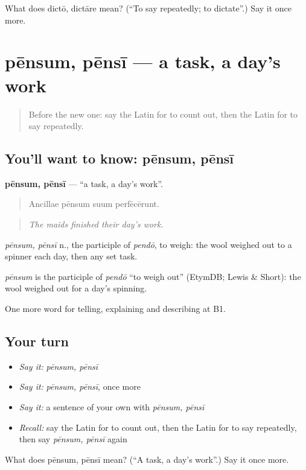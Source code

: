 \begin{tcolorbox}[breakable,colback=teal!4,colframe=teal!35!black,title={Before you move on}]
What does dictō, dictāre mean? (\textquotedblleft{}To say repeatedly; to dictate\textquotedblright{}.) Say it once more.
\end{tcolorbox}
\section[pēnsum, pēnsī]{pēnsum, pēnsī — a task, a day's work}

\label{lesson:LA-C405-pensum}



\begin{quote}
Before the new one: say the Latin for to count out, then the Latin for to say repeatedly.
\end{quote}

\subsection*{You'll want to know: pēnsum, pēnsī}
\textbf{pēnsum, pēnsī} — \textquotedblleft{}a task, a day's work\textquotedblright{}.

\begin{quote}
Ancillae pēnsum suum perfēcērunt.
\end{quote}

\begin{quote}
\emph{The maids finished their day's work.}
\end{quote}

\emph{pēnsum, pēnsī} n., the participle of \emph{pendō}, to weigh: the wool weighed out to a spinner each day, then any set task.

\begin{cousinweb}
\emph{pēnsum} is the participle of \emph{pendō} \textquotedblleft{}to weigh out\textquotedblright{} (EtymDB; Lewis \& Short): the wool weighed out for a day's spinning.
\end{cousinweb}

\begin{grammarlens}[title={What you've built}]
One more word for telling, explaining and describing at B1.
\end{grammarlens}

\subsection*{Your turn}
\begin{itemize}
\raggedright
  \item \emph{Say it:} \emph{pēnsum, pēnsī}
  \item \emph{Say it:} \emph{pēnsum, pēnsī}, once more
  \item \emph{Say it:} a sentence of your own with \emph{pēnsum, pēnsī}
  \item \emph{Recall:} say the Latin for to count out, then the Latin for to say repeatedly, then say \emph{pēnsum, pēnsī} again
\end{itemize}

\begin{tcolorbox}[breakable,colback=teal!4,colframe=teal!35!black,title={Before you move on}]
What does pēnsum, pēnsī mean? (\textquotedblleft{}A task, a day's work\textquotedblright{}.) Say it once more.
\end{tcolorbox}
